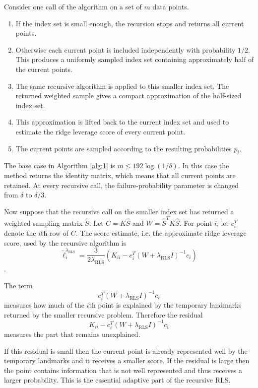 Consider one call of the algorithm on a set of $m$ data points.

\begin{enumerate}
\item If the index set is small enough, the recursion stops and returns all current points.
\item Otherwise each current point is included independently with probability $1/2$. This produces a uniformly sampled index set containing approximately half of the current points.
\item The same recursive algorithm is applied to this smaller index set. The returned weighted sample gives a compact approximation of the half-sized index set.
\item This approximation is lifted back to the current index set and used to estimate the ridge leverage score of every current point.
\item The current points are sampled according to the resulting probabilities $p_i$.
\end{enumerate}

The base case in Algorithm \ref{alg:1} is $m\leq 192\log(1/\delta)$. In this case the method returns the identity matrix, which means that all current points are retained. At every recursive call, the failure-probability parameter is changed from $\delta$ to $\delta/3$.

Now suppose that the recursive call on the smaller index set has returned a weighted sampling matrix $\widehat S$. Let $C=K\widehat S$ and $W=\widehat S^T K\widehat S$. For point $i$, let $c_i^T$ denote the $i$th row of $C$. The score estimate, i.e. the approximate ridge leverage score, used by the recursive algorithm is
\[
\widetilde\ell_i^{\lambda_{\mathrm{RLS}}} = \frac{3}{2\lambda_{\mathrm{RLS}}} ( K_{ii} - c_i^T ( W+\lambda_{\mathrm{RLS}}I )^{-1} c_i )
\] \citep[Algorithm~2]{musco2017recursive}.

The term
\[
c_i^T ( W+\lambda_{\mathrm{RLS}}I )^{-1} c_i
\]
measures how much of the $i$th point is explained by the temporary landmarks returned by the smaller recursive problem. Therefore the residual
\[
K_{ii} - c_i^T ( W+\lambda_{\mathrm{RLS}}I )^{-1} c_i
\]
measures the part that remains unexplained.

If this residual is small then the current point is already represented well by the temporary landmarks and it receives a smaller score. If the residual is large then the point contains information that is not well represented and thus receives a larger probability. This is the essential adaptive part of the recursive RLS.

